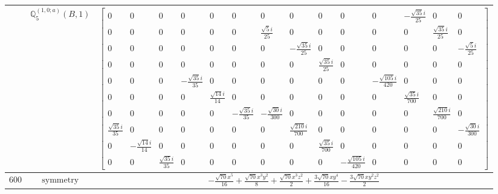 \documentclass[fleqn,8pt,landscape]{jsarticle}
\begin{document}
\begin{longtable}{ccc}
$  $ & $ \mathbb{Q}_{5}^{(1,0;a)}(B,1) $ & $ \begin{bmatrix} 0 & 0 & 0 & 0 & 0 & 0 & 0 & 0 & 0 & 0 & 0 & - \frac{\sqrt{35} i}{25} & 0 & 0 \\ 0 & 0 & 0 & 0 & 0 & 0 & \frac{\sqrt{5} i}{25} & 0 & 0 & 0 & 0 & 0 & \frac{\sqrt{35} i}{25} & 0 \\ 0 & 0 & 0 & 0 & 0 & 0 & 0 & - \frac{\sqrt{35} i}{25} & 0 & 0 & 0 & 0 & 0 & - \frac{\sqrt{5} i}{25} \\ 0 & 0 & 0 & 0 & 0 & 0 & 0 & 0 & \frac{\sqrt{35} i}{25} & 0 & 0 & 0 & 0 & 0 \\ 0 & 0 & 0 & - \frac{\sqrt{35} i}{35} & 0 & 0 & 0 & 0 & 0 & 0 & - \frac{\sqrt{105} i}{420} & 0 & 0 & 0 \\ 0 & 0 & 0 & 0 & \frac{\sqrt{14} i}{14} & 0 & 0 & 0 & 0 & 0 & 0 & \frac{\sqrt{35} i}{700} & 0 & 0 \\ 0 & 0 & 0 & 0 & 0 & - \frac{\sqrt{35} i}{35} & - \frac{\sqrt{30} i}{300} & 0 & 0 & 0 & 0 & 0 & \frac{\sqrt{210} i}{700} & 0 \\ \frac{\sqrt{35} i}{35} & 0 & 0 & 0 & 0 & 0 & 0 & \frac{\sqrt{210} i}{700} & 0 & 0 & 0 & 0 & 0 & - \frac{\sqrt{30} i}{300} \\ 0 & - \frac{\sqrt{14} i}{14} & 0 & 0 & 0 & 0 & 0 & 0 & \frac{\sqrt{35} i}{700} & 0 & 0 & 0 & 0 & 0 \\ 0 & 0 & \frac{\sqrt{35} i}{35} & 0 & 0 & 0 & 0 & 0 & 0 & - \frac{\sqrt{105} i}{420} & 0 & 0 & 0 & 0 \end{bmatrix} $ \\ \hline
$ 600 $ & $ \text{symmetry} $ & $ - \frac{\sqrt{70} x^{5}}{16} + \frac{\sqrt{70} x^{3} y^{2}}{8} + \frac{\sqrt{70} x^{3} z^{2}}{2} + \frac{3 \sqrt{70} x y^{4}}{16} - \frac{3 \sqrt{70} x y^{2} z^{2}}{2} $ \\

\end{longtable}
\end{document}
